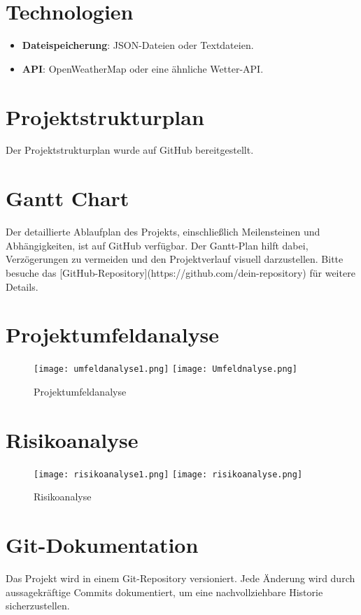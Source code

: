 \documentclass[a4paper,12pt]{article}
\begin{document}
\section{Technologien}
\begin{itemize}
    \item \textbf{Dateispeicherung}: JSON-Dateien oder Textdateien.
    \item \textbf{API}: OpenWeatherMap oder eine ähnliche Wetter-API.
\end{itemize}

\section{Projektstrukturplan}
Der Projektstrukturplan wurde auf GitHub bereitgestellt.

\section{Gantt Chart}
Der detaillierte Ablaufplan des Projekts, einschließlich Meilensteinen und Abhängigkeiten, ist auf GitHub verfügbar. Der Gantt-Plan hilft dabei, Verzögerungen zu vermeiden und den Projektverlauf visuell darzustellen. Bitte besuche das [GitHub-Repository](https://github.com/dein-repository) für weitere Details.

\section{Projektumfeldanalyse}
\begin{figure}[h]
    \centering
    \texttt{[image: umfeldanalyse1.png]}
    \texttt{[image: Umfeldnalyse.png]}
    \caption{Projektumfeldanalyse}
    \label{fig:projektumfeldanalyse}
\end{figure}

\section{Risikoanalyse}
\begin{figure}[h]
    \centering
    \texttt{[image: risikoanalyse1.png]}
    \texttt{[image: risikoanalyse.png]}
    \caption{Risikoanalyse}
    \label{fig:risikoanalyse}
\end{figure}

\section{Git-Dokumentation}
Das Projekt wird in einem Git-Repository versioniert. Jede Änderung wird durch aussagekräftige Commits dokumentiert, um eine nachvollziehbare Historie sicherzustellen.
\end{document}
